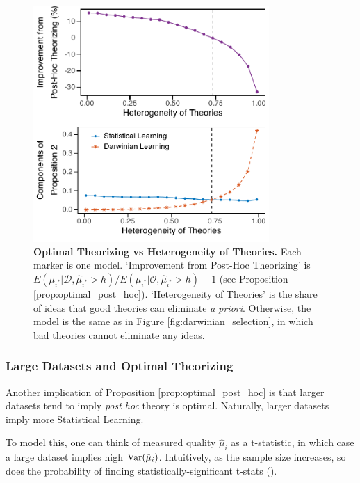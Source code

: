 \documentclass[12pt,english]{article}
\theoremstyle{plain}
\theoremstyle{plain}
\begin{document}
\begin{figure}
    \centering
    \includegraphics[width=0.8\textwidth]{many-qgood.pdf}
    \caption{\textbf{Optimal Theorizing vs Heterogeneity of Theories.} Each marker is one model. `Improvement from Post-Hoc Theorizing' is $E\left(\mu_{i^{\ast}}|\mathcal{D}, \hat{\mu}_{i^{\ast}}>h\right)/E\left(\mu_{i^{\ast}}|\mathcal{O}, \hat{\mu}_{i^{\ast}}>h\right)-1$ (see Proposition \ref{prop:optimal_post_hoc}). `Heterogeneity of Theories' is the share of ideas that good theories can eliminate \emph{a priori}. Otherwise, the model is the same as in Figure \ref{fig:darwinian_selection}, in which bad theories cannot eliminate any ideas.}
    \label{fig:prop2-het}
\end{figure}

\subsubsection{Large Datasets and Optimal Theorizing}\label{sec:het-bigdata}

Another implication of Proposition \ref{prop:optimal_post_hoc} is that larger datasets tend to imply \emph{post hoc} theory is optimal. Naturally, larger datasets imply more Statistical Learning. 

To model this, one can think of measured quality $\hat{\mu}_i$ as a t-statistic, in which case a large dataset implies high $\text{Var}(\hat{\mu}_i)$.  Intuitively, as the sample size increases, so does the probability of finding statistically-significant t-stats (\citealt{abadie2020statistical}). 
\end{document}
